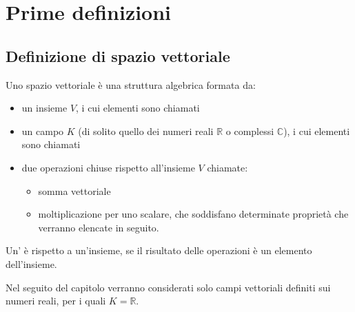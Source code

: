 \documentclass[letterpaper,10pt,english]{jupyterBook}
\begin{document}
\section{Prime definizioni}
\label{\detokenize{ch/algebra/vector-algebra-def:prime-definizioni}}\label{\detokenize{ch/algebra/vector-algebra-def:math-hs-algebra-vector-def}}\label{\detokenize{ch/algebra/vector-algebra-def::doc}}

\subsection{Definizione di spazio vettoriale}
\label{\detokenize{ch/algebra/vector-algebra-def:definizione-di-spazio-vettoriale}}
\sphinxAtStartPar
Uno spazio vettoriale è una struttura algebrica formata da:
\begin{itemize}
\item {} 
\sphinxAtStartPar
un insieme \(V\), i cui elementi sono chiamati 

\item {} 
\sphinxAtStartPar
un campo \(K\) (di solito quello dei numeri reali \(\mathbb{R}\) o complessi \(\mathbb{C}\)), i cui elementi sono chiamati 

\item {} 
\sphinxAtStartPar
due operazioni chiuse rispetto all’insieme \(V\) chiamate:
\begin{itemize}
\item {} 
\sphinxAtStartPar
somma vettoriale

\item {} 
\sphinxAtStartPar
moltiplicazione per uno scalare,
che soddisfano determinate proprietà che verranno elencate in seguito.

\end{itemize}

\end{itemize}

\sphinxAtStartPar
Un’ è  rispetto a un’insieme, se il risultato delle operazioni è un elemento dell’insieme.

\sphinxAtStartPar
Nel seguito del capitolo verranno considerati solo campi vettoriali definiti sui numeri reali, per i quali \(K = \mathbb{R}\).
\end{document}
